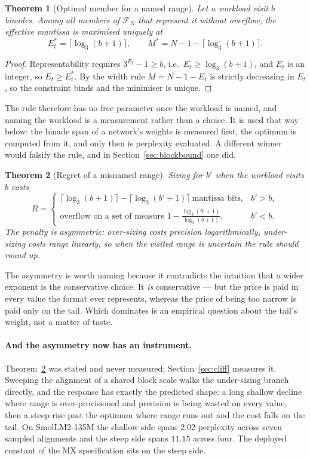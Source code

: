 \documentclass[11pt]{article}
\newtheorem{theorem}{Theorem}
\theoremstyle{definition}
\begin{document}
\begin{theorem}[Optimal member for a named range]
\label{thm:optimal}
Let a workload visit $b$ binades. Among all members of $\mathcal{F}_N$ that
represent it without overflow, the effective mantissa is maximised uniquely at
\[
  E_t^{*} = \bigl\lceil \log_3 (b+1) \bigr\rceil,
  \qquad
  M^{*} = N - 1 - \bigl\lceil \log_3 (b+1) \bigr\rceil .
\]
\end{theorem}
\begin{proof}
Representability requires $3^{E_t}-1 \ge b$, i.e.\ $E_t \ge \log_3(b+1)$, and
$E_t$ is an integer, so $E_t \ge E_t^{*}$. By the width rule $M = N-1-E_t$ is
strictly decreasing in $E_t$, so the constraint binds and the minimiser is unique.
\end{proof}

The rule therefore has no free parameter once the workload is named, and naming
the workload is a measurement rather than a choice. It is used that way below:
the binade span of a network's weights is measured first, the optimum is computed
from it, and only then is perplexity evaluated. A different winner would falsify
the rule, and in Section~\ref{sec:blockbound} one did.

\begin{theorem}[Regret of a misnamed range]
\label{thm:regret}
Sizing for $b'$ when the workload visits $b$ costs
\[
  R =
  \begin{cases}
    \lceil\log_3(b+1)\rceil - \lceil\log_3(b'+1)\rceil \ \text{mantissa bits}, & b' > b,\\[2pt]
    \text{overflow on a set of measure } 1 - \tfrac{\log_3(b'+1)}{\log_3(b+1)}, & b' < b .
  \end{cases}
\]
The penalty is asymmetric: over-sizing costs precision logarithmically, under-sizing
costs range linearly, so when the visited range is uncertain the rule should round up.
\end{theorem}

The asymmetry is worth naming because it contradicts the intuition that a wider
exponent is the conservative choice. It \emph{is} conservative --- but the price is
paid in every value the format ever represents, whereas the price of being too
narrow is paid only on the tail. Which dominates is an empirical question about
the tail's weight, not a matter of taste.

\paragraph{And the asymmetry now has an instrument.} Theorem~\ref{thm:regret} was
stated and never measured; Section~\ref{sec:cliff} measures it. Sweeping the
alignment of a shared block scale walks the under-sizing branch directly, and the
response has exactly the predicted shape: a long shallow decline where range is
over-provisioned and precision is being wasted on every value, then a steep rise
past the optimum where range runs out and the cost falls on the tail. On
SmolLM2-135M the shallow side spans $2.02$ perplexity across seven sampled
alignments and the steep side spans $11.15$ across four. The deployed constant
of the MX specification sits on the steep side.
\end{document}
